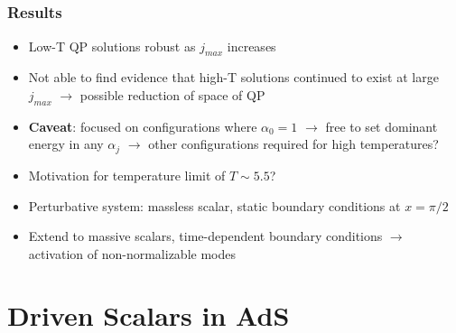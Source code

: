 \documentclass[mathserif,10pt]{beamer}
\newcommand{\bi}{\begin{itemize}}
\newcommand{\ei}{\end{itemize}}
\newcommand{\its}{\item}
\newcommand{\jm}{j_{max}}
\begin{document}
{{\begin{overlayarea}{\textwidth}{0.65\textheight}
\begin{figure}
{      }
      \end{figure}
  \end{overlayarea}
}


\subsection*{}
\frame
{
  \frametitle{Results}
    \bi
    \its Low-T QP solutions robust as $\jm$ increases
    \its Not able to find evidence that high-T solutions continued to exist at large $\jm$ $\to$ possible reduction of space of QP
    \its {\bf Caveat}: focused on configurations where $\alpha_0 = 1$ $\to$ free to set dominant energy in any $\alpha_j$ $\to$ other configurations required for high temperatures?
    \its Motivation for temperature limit of $T \sim 5.5$?
    \its Perturbative system: massless scalar, static boundary conditions at $x = \pi/2$
    \its Extend to massive scalars, time-dependent boundary conditions $\to$ activation of non-normalizable modes
    \ei
}


\section{Driven Scalars in AdS}


}
\end{document}
